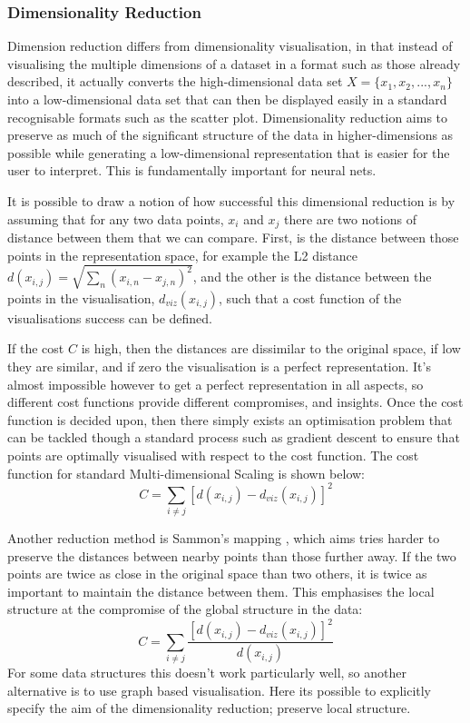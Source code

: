 \documentclass[a4paper,11pt,titlepage]{article}
\begin{document}
		\subsubsection{Dimensionality Reduction}
		Dimension reduction differs from dimensionality visualisation, in that instead of visualising the multiple dimensions of a dataset in a format such as those already described, it actually converts the high-dimensional data set  $ X = \{ x_{1}, x_{2},..., x_{n} \} $ into a low-dimensional data set that can then be displayed easily in a standard recognisable formats such as the scatter plot. Dimensionality reduction aims to preserve as much of the significant structure of the data in higher-dimensions as possible while generating a low-dimensional representation that is easier for the user to interpret. This is fundamentally important for neural nets.
		\par 
		It is possible to draw a notion of how successful this dimensional reduction is by assuming that for any two data points, $ x_{i} $ and $ x_{j} $ there are two notions of distance between them that we can compare. First, is the distance between those points in the representation space, for example the L2 distance $ d(x_{i,j}) = \sqrt{\sum\nolimits_{n} (x_{i,n} - x_{j,n})^2 } $, and the other is the  distance between the points in the visualisation, $ d_{viz}(x_{i,j}) $, such that a cost function of the visualisations success can be defined.
		\par  		
		If the cost $ C $ is high, then the distances are dissimilar to the original space, if low they are similar, and if zero the visualisation is a perfect representation. It's almost impossible however to get a perfect representation in all aspects, so different cost functions provide different compromises, and insights. Once the cost function is decided upon, then there simply exists an optimisation problem that can be tackled though a standard process such as gradient descent to ensure that  points are optimally visualised with respect to the cost function. The cost function for standard Multi-dimensional Scaling \cite{Torgerson1952} is shown below: 
		$$
			C = 
			\sum\limits_{i \neq j}
			[d(x_{i,j}) - d_{viz}(x_{i,j}) ]^2
		$$
		\par 
		Another reduction method is Sammon's mapping \cite{Sammon1969}, which aims tries harder to preserve the distances between nearby points than those further away. If the two points are twice as close in the original space than  two others, it is twice as important to maintain the distance between them. This emphasises the local structure at the compromise of the global structure in the data:
		$$
			C = 
			\sum\limits_{i \neq j}
			\frac{ [d(x_{i,j}) - d_{viz}(x_{i,j}) ]^2 }					{d(x_{i,j})}
		$$
		For some data structures this doesn't work particularly well, so another alternative is to use graph based visualisation. Here its possible to explicitly specify the aim of the dimensionality reduction; preserve local structure. 
		 		
\end{document}
